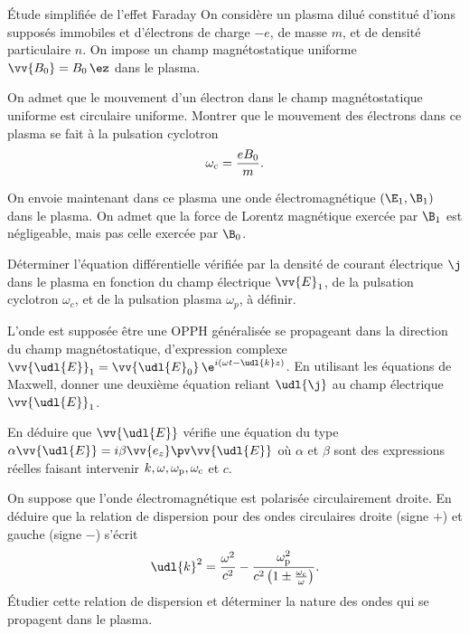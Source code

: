 \begin{exo}[PC][2][colle]{Étude simplifiée de l'effet Faraday}
On considère un plasma dilué constitué d'ions supposés immobiles et d'électrons de charge $-e$, de masse $m$, et de densité particulaire $n$. On impose un champ magnétostatique uniforme $\vv{B_0}=B_0\,\ez$ dans le plasma.
\begin{quest}
\item On admet que le mouvement d'un électron dans le champ magnétostatique uniforme est circulaire uniforme. Montrer que le mouvement des électrons dans ce plasma se fait à la pulsation cyclotron
\begin{equation}
\omega_{\rm{c}}=\frac{eB_0}{m}.
\end{equation}
\end{quest}
On envoie  maintenant dans ce plasma une onde électromagnétique $(\E_1,\B_1)$ dans le plasma. On admet que la force de Lorentz magnétique exercée par $\B_1$ est négligeable, mais pas celle exercée par $\B_0$.
\begin{quest}
\item Déterminer l'équation différentielle vérifiée par la densité de courant électrique ${\j}$ dans le plasma en fonction du champ électrique $\vv{E}_1$, de la pulsation cyclotron $\omega_c$, et de la pulsation plasma $\omega_p$, à définir.
\item L'onde est supposée être une OPPH généralisée se propageant dans la direction  du champ magnétostatique, d'expression complexe $\vv{\udl{E}}_1=\vv{\udl{E}_0}\,\e^{i(\omega t-\udl{k} z)}$. En utilisant les équations de Maxwell, donner une deuxième équation reliant ${\udl{\j}}$ au champ électrique $\vv{\udl{E}}_1$.
\item En déduire que $\vv{\udl{E}}$ vérifie une équation du type $\alpha\vv{\udl{E}}=i\beta\vv{e_z}\pv\vv{\udl{E}}$ où $\alpha$ et $\beta$ sont des expressions réelles faisant intervenir $k,\omega,\omega_{\rm{p}},\omega_{\rm c}$ et $c$.
\item
On suppose que l'onde électromagnétique est polarisée circulairement droite.
En déduire que la relation de dispersion pour des ondes circulaires droite (signe $+$) et gauche (signe $-$) s'écrit
\begin{equation}
\udl{k}^2=\frac{\omega^2}{c^2}-\frac{\omega_{\rm{p}}^2}{c^2\left(1\pm\frac{\omega_{\rm{c}}}{\omega}\right)}.
\end{equation}
Étudier cette relation de dispersion et déterminer la nature des ondes qui se propagent dans le plasma.

\end{quest}
\end{exo}
